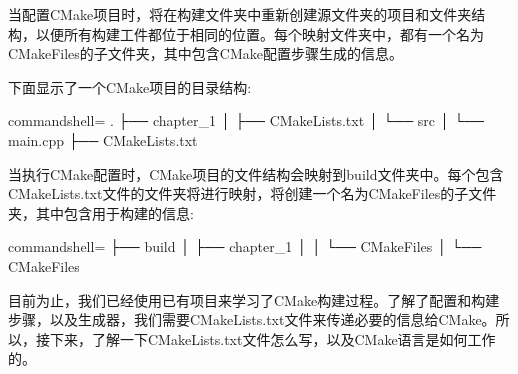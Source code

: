 当配置CMake项目时，将在构建文件夹中重新创建源文件夹的项目和文件夹结构，以便所有构建工件都位于相同的位置。每个映射文件夹中，都有一个名为CMakeFiles的子文件夹，其中包含CMake配置步骤生成的信息。

下面显示了一个CMake项目的目录结构:

\begin{tcblisting}{commandshell={}}
.
├── chapter_1
│      ├── CMakeLists.txt
│      └── src
│            └── main.cpp
├── CMakeLists.txt
\end{tcblisting}

当执行CMake配置时，CMake项目的文件结构会映射到build文件夹中。每个包含CMakeLists.txt文件的文件夹将进行映射，将创建一个名为CMakeFiles的子文件夹，其中包含用于构建的信息:

\begin{tcblisting}{commandshell={}}
├── build
│     ├── chapter_1
│     │      └── CMakeFiles
│     └── CMakeFiles
\end{tcblisting}

目前为止，我们已经使用已有项目来学习了CMake构建过程。了解了配置和构建步骤，以及生成器，我们需要CMakeLists.txt文件来传递必要的信息给CMake。所以，接下来，了解一下CMakeLists.txt文件怎么写，以及CMake语言是如何工作的。























